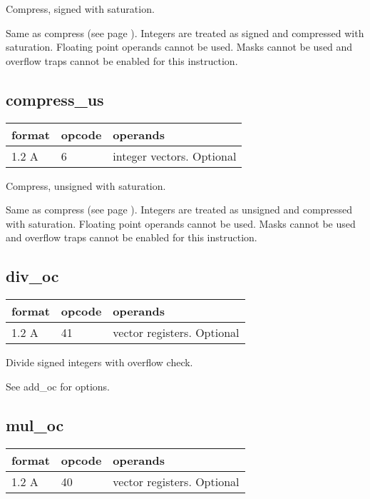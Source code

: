 \documentclass[forwardcom.tex]{subfiles}
\begin{document}
Compress, signed with saturation.
\vv

Same as compress (see page \pageref{table:compressInstruction}). Integers are treated as signed and compressed with saturation. Floating point operands cannot be used. 
Masks cannot be used and overflow traps cannot be enabled for this instruction.
\vv

\subsection{compress\_us}
\label{table:compressUsInstruction}
\begin{tabular}{|p{12mm}|p{15mm}|p{100mm}|}
\hline
\bfseries format & \bfseries opcode & \bfseries operands \\ \hline
1.2 A & 6 & integer vectors. Optional \\ \hline
\end{tabular}
\vv

Compress, unsigned with saturation.
\vv

Same as compress (see page \pageref{table:compressInstruction}). Integers are treated as unsigned and compressed with saturation. Floating point operands cannot be used.
Masks cannot be used and overflow traps cannot be enabled for this instruction.
\vv


\subsection{div\_oc}
\label{table:divOcInstruction}
\begin{tabular}{|p{12mm}|p{15mm}|p{100mm}|}
\hline
\bfseries format & \bfseries opcode & \bfseries operands \\ \hline
1.2 A & 41 & vector registers. Optional \\ \hline
\end{tabular}
\vv

Divide signed integers with overflow check.

See add\_oc for options.
\vv

\subsection{mul\_oc}
\label{table:mulOcInstruction}
\begin{tabular}{|p{12mm}|p{15mm}|p{100mm}|}
\hline
\bfseries format & \bfseries opcode & \bfseries operands \\ \hline
1.2 A & 40 & vector registers. Optional \\ \hline
\end{tabular}
\vv
\end{document}

